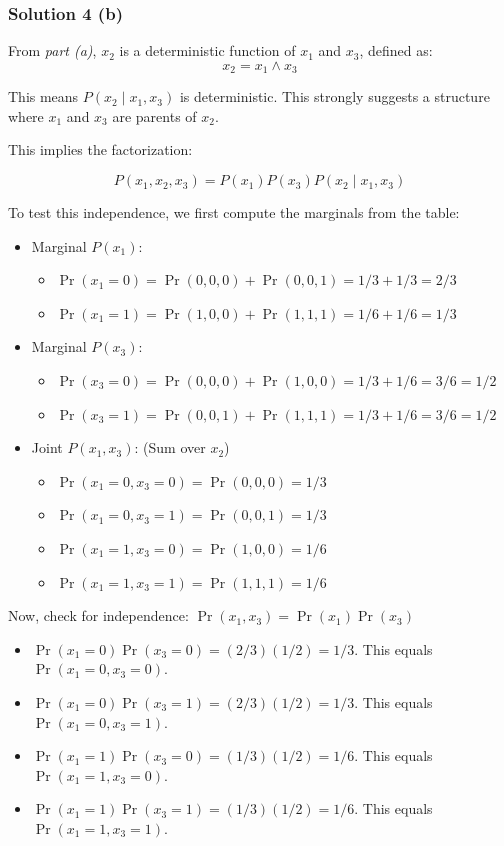 \documentclass{article}
\begin{document}
\subsubsection*{Solution 4 (b)}
From \textit{part (a)}, $x_2$ is a deterministic function of $x_1$ and $x_3$, defined as:
$$x_2 = x_1 \land x_3$$
\begin{flushleft}
    This means $P(x_2 \mid x_1, x_3)$ is deterministic. This strongly suggests a structure where $x_1$ and $x_3$ are parents of $x_2$.
\end{flushleft}
\begin{flushleft}
    This implies the factorization: 
\end{flushleft}
$$P(x_1, x_2, x_3) = P(x_1)P(x_3)P(x_2 \mid x_1, x_3)$$

To test this independence, we first compute the marginals from the table:
\begin{itemize}
    \item Marginal $P(x_1)$:
        \begin{itemize}
            \item $\Pr(x_1=0) = \Pr(0,0,0) + \Pr(0,0,1) = 1/3 + 1/3 = 2/3$
            \item $\Pr(x_1=1) = \Pr(1,0,0) + \Pr(1,1,1) = 1/6 + 1/6 = 1/3$
        \end{itemize}
    \item Marginal $P(x_3)$:
        \begin{itemize}
            \item $\Pr(x_3=0) = \Pr(0,0,0) + \Pr(1,0,0) = 1/3 + 1/6 = 3/6 = 1/2$
            \item $\Pr(x_3=1) = \Pr(0,0,1) + \Pr(1,1,1) = 1/3 + 1/6 = 3/6 = 1/2$
        \end{itemize}
    \item Joint $P(x_1, x_3)$: (Sum over $x_2$)
        \begin{itemize}
            \item $\Pr(x_1=0, x_3=0) = \Pr(0,0,0) = 1/3$
            \item $\Pr(x_1=0, x_3=1) = \Pr(0,0,1) = 1/3$
            \item $\Pr(x_1=1, x_3=0) = \Pr(1,0,0) = 1/6$
            \item $\Pr(x_1=1, x_3=1) = \Pr(1,1,1) = 1/6$
        \end{itemize}
\end{itemize}
Now, check for independence: $\Pr(x_1, x_3) = \Pr(x_1)\Pr(x_3)$
\begin{itemize}
    \item $\Pr(x_1=0)\Pr(x_3=0) = (2/3)(1/2) = 1/3$. This equals $\Pr(x_1=0, x_3=0)$.
    \item $\Pr(x_1=0)\Pr(x_3=1) = (2/3)(1/2) = 1/3$. This equals $\Pr(x_1=0, x_3=1)$.
    \item $\Pr(x_1=1)\Pr(x_3=0) = (1/3)(1/2) = 1/6$. This equals $\Pr(x_1=1, x_3=0)$.
    \item $\Pr(x_1=1)\Pr(x_3=1) = (1/3)(1/2) = 1/6$. This equals $\Pr(x_1=1, x_3=1)$.
\end{itemize}
\end{document}
